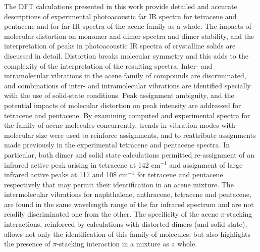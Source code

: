 The DFT calculations presented in this work provide detailed and accurate descriptions of experimental photoacoustic far IR spectra for tetracene and pentacene and for far IR spectra of the acene family as a whole.  The impacts of molecular distortion on monomer and dimer spectra and dimer stability, and the interpretation of peaks in photoacoustic IR spectra of crystalline solids are discussed in detail. Distortion breaks molecular symmetry and this adds to the complexity of the interpretation of the resulting spectra. Inter- and intramolecular vibrations in the acene family of compounds are discriminated, and combinations of inter- and intramolecular vibrations are identified specially with the use of solid-state conditions. Peak assignment ambiguity, and the potential impacts of molecular distortion on peak intensity are addressed for tetracene and pentacene. By examining computed and experimental spectra for the family of acene molecules concurrently, trends in vibration modes with molecular size were used to reinforce assignments, and to reattribute assignments made previously in the experimental tetracene and pentacene spectra. In particular, both dimer and solid state calculations permitted re-assignment of an infrared active peak arising in tetracene at 142 cm$^{-1}$ and assignment of large infrared active peaks at 117 and 108 cm$^{-1}$ for tetracene and pentacene respectively that may permit their identification in an acene mixture. The intermolecular vibrations for naphthalene, anthracene, tetracene and pentacene, are found in the same wavelength range of the far infrared spectrum and are not readily discriminated one from the other. The specificity of the acene $\pi$-stacking interactions, reinforced by calculations with distorted dimers (and solid-state), allows not only the identification of this family of molecules, but also highlights the presence of $\pi$-stacking interaction in a mixture as a whole.\\
 
